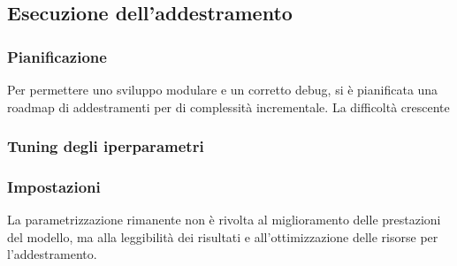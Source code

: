 \subsection{Esecuzione dell'addestramento}
\subsubsection{Pianificazione}
Per permettere uno sviluppo modulare e un corretto debug, si è pianificata una roadmap di addestramenti per di complessità incrementale. La difficoltà crescente


\subsubsection{Tuning degli iperparametri}


\subsubsection{Impostazioni}
La parametrizzazione rimanente non è rivolta al miglioramento delle prestazioni del modello, ma alla leggibilità dei risultati e all'ottimizzazione delle risorse per l'addestramento. 



